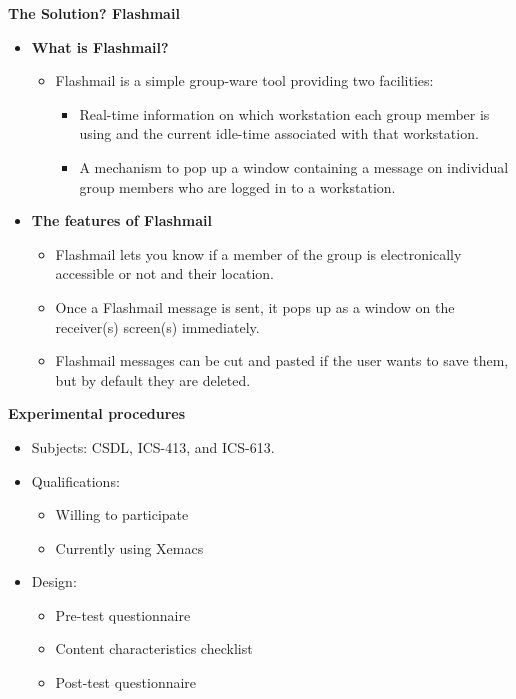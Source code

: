\begin{slide}\Huge 
  {\bf The Solution?  Flashmail} \horizontalline
  \begin{itemize}\huge
  \item {\bf What is Flashmail?}
    \begin{itemize}
    \item Flashmail is a simple group-ware tool providing two
      facilities:
      \begin{itemize}
      \item Real-time information on which workstation each group
        member is using and the current idle-time associated with
        that workstation.  \item A mechanism to pop up a window
        containing a message on individual group members who are
        logged in to a workstation.
      \end{itemize}
    \end{itemize}
  \item {\bf The features of Flashmail}
    \begin{itemize}
    \item Flashmail lets you know if a member of the group is
      electronically accessible or not and their location.  \item Once
      a Flashmail message is sent, it pops up as a window on the
      receiver(s) screen(s) immediately.  \item Flashmail messages can
      be cut and pasted if the user wants to save them, but by default
      they are deleted.
    \end{itemize}
  \end{itemize} 
\end{slide}


\begin{slide}\Huge 
  {\bf Experimental procedures} \horizontalline
  \begin{itemize}\huge
  \item Subjects: CSDL, ICS-413, and ICS-613.  \item Qualifications:
    \begin{itemize}
    \item Willing to participate \item Currently using Xemacs
    \end{itemize}  
  \item Design:
    \begin{itemize}
    \item Pre-test questionnaire \item Content characteristics checklist
    \item Post-test questionnaire
    \end{itemize}
    
  \end{itemize} 
\end{slide}

 




